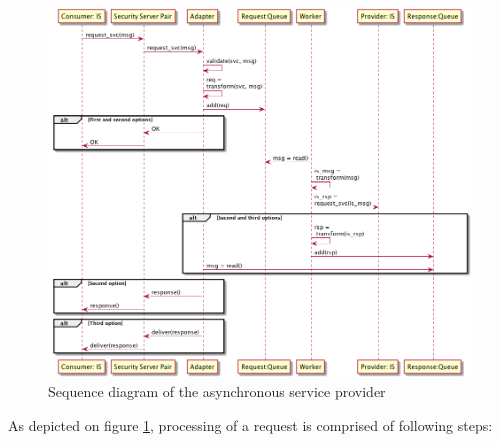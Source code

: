 \documentclass[10pt,a4paper]{article}
\begin{document}
\begin{figure}[htp]
	\begin{center}
		\includegraphics[width=.85\textwidth]{5_seq.png}
		\caption{Sequence diagram of the asynchronous service provider}
		\label{fig:p:5:async}
	\end{center}
\end{figure}

As depicted on figure \ref{fig:p:5:async}, processing of a request is comprised of following steps:
\end{document}
